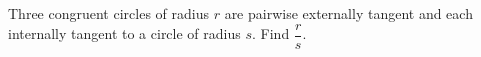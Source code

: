 Three congruent circles of radius $r$ are pairwise externally tangent and each internally tangent to a circle of radius $s$. Find $\dfrac{r}{s}$.
